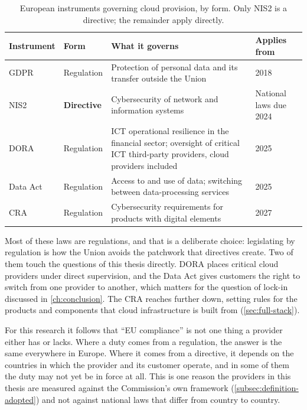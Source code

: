 \begin{table}[htbp]
  \centering
  \caption{European instruments governing cloud provision, by form. Only
           \acs{NIS2} is a directive; the remainder apply directly.}
  \label{tab:eu-instruments}
  \small
  \begin{tabularx}{\textwidth}{@{}l l X l@{}}
    \toprule
    \textbf{Instrument} & \textbf{Form} & \textbf{What it governs} & \textbf{Applies from} \\
    \midrule
    \acs{GDPR}
      & Regulation & Protection of personal data and its transfer outside the Union
      & 2018 \\[0.35em]
    \acs{NIS2}
      & \textbf{Directive} & Cybersecurity of network and information systems
      & National laws due 2024 \\[0.35em]
    \acs{DORA}
      & Regulation & ICT operational resilience in the financial sector; oversight
        of critical ICT third-party providers, cloud providers included
      & 2025 \\[0.35em]
    Data Act
      & Regulation & Access to and use of data; switching between data-processing
        services
      & 2025 \\[0.35em]
    \acs{CRA}
      & Regulation & Cybersecurity requirements for products with digital elements
      & 2027 \\
    \bottomrule
  \end{tabularx}
\end{table}

Most of these laws are regulations, and that is a deliberate choice: legislating by
regulation is how the Union avoids the patchwork that directives create. Two of
them touch the questions of this thesis directly. \Ac{DORA} \cite{DORA_2022}
places critical cloud providers under direct supervision, and the Data Act
\cite{DataAct_2023} gives customers the right to switch from one provider to
another, which matters for the question of lock-in discussed in
\cref{ch:conclusion}. The \ac{CRA} \cite{CRA_2024} reaches further down, setting
rules for the products and components that cloud infrastructure is built from
(\cref{sec:full-stack}).

For this research it follows that \enquote{\ac{EU} compliance} is not one thing a
provider either has or lacks. Where a duty comes from a regulation, the answer is
the same everywhere in Europe. Where it comes from a directive, it depends on the
countries in which the provider and its customer operate, and in some of them the
duty may not yet be in force at all. This is one reason the providers in this
thesis are measured against the Commission's own framework
(\cref{subsec:definition-adopted}) and not against national laws that differ from
country to country.

